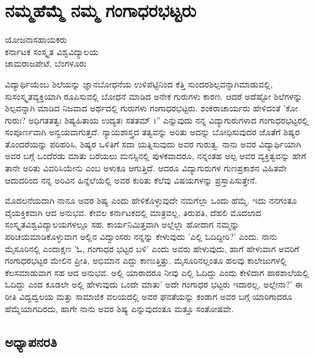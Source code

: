\chapter{ನಮ್ಮಹೆಮ್ಮೆ ನಮ್ಮ ಗಂಗಾಧರಭಟ್ಟರು}

\begin{center}
\smallskip
ಯೋಜನಾಸಹಾಯಕರು\\
ಕರ್ನಾಟಕ ಸಂಸ್ಕೃತ ವಿಶ್ವವಿದ್ಯಾಲಯ\\
ಚಾಮರಾಜಪೇಟೆ, ಬೆಂಗಳೂರು
\addrule
\end{center}

ವಿದ್ಯಾರ್ಥಿಯೆಂಬ ಶಿಲೆಯನ್ನು ಜ್ಞಾನಬೋಧನೆಯ ಉಳಿಪೆಟ್ಟಿನಿಂದ ಕೆತ್ತಿ ಸುಂದರಶಿಲ್ಪವನ್ನಾಗಿಮಾಡುವಲ್ಲಿ, ಸುಸಂಸ್ಕೃತವ್ಯಕ್ತಿಯಾಗಿ ರೂಪಿಸುವಲ್ಲಿ ಬೋಧನೆ ಮಾಡಿದ ಅನೇಕ ಗುರುಗಳು ಕಾರಣ. ಆದರೆ ಅದೆಷ್ಟೋ ಶಿಲೆಗಳನ್ನು ಶಿಲ್ಪವನ್ನಾಗಿ ಮಾಡಿದ ನಿಜವಾದ ಅರ್ಥದಲ್ಲಿ ಗುರುಗಳು ಗಂಗಾಧರಭಟ್ಟರು. ಶಂಕರಾಚಾರ್ಯರು ಹೇಳಿದಂತೆ ’ಕೋ ಗುರುಃ? ಅಧಿಗತತತ್ವಃ ಶಿಷ್ಯಹಿತಾಯ ಉದ್ಯತಃ ಸತತಮ್ ।” ಎನ್ನುವುದು ನನ್ನ ವಿದ್ಯಾಗುರುಗಳಾದ ಗಂಗಾಧರಭಟ್ಟರಲ್ಲಿ ಸಂಪೂರ್ಣವಾಗಿ ಅನ್ವಯವಾಗುತ್ತದೆ. ನ್ಯಾಯಶಾಸ್ತ್ರದ ತತ್ವವನ್ನು ಅರಿತು ಅದನ್ನು ಬೋಧಿಸುವುದರ ಜೊತೆಗೆ ಶಿಷ್ಯರ ತೊಂದರೆಯನ್ನು ಪರಿಹರಿಸಿ, ಶಿಷ್ಯರ ಒಳಿತಿಗೆ ಸದಾ ಯತ್ನಿಸುವುದು ಅವರ ಗುರುತ್ವ. ನಾನು ಅವರ ವಿದ್ಯಾರ್ಥಿಯಾಗಿ ಅವರ ಬಗ್ಗೆ ಒಂದೆರಡು ಮಾತು ಬರೆಯಲು ಮನಸ್ಸಿನಲ್ಲಿ ಪುಳಕವಾದರೂ, ನನ್ನಂತಹ ಅಲ್ಪ ಅವರ ವ್ಯಕ್ತಿತ್ವವನ್ನು ಹೇಗೆ ತಾನೇ ಅರಿತು ವಿವರಿಸಿಯೇನು ಎಂಬ ಅಳುಕೂ ಆಗುತ್ತಿದೆ. ಆದರೂ ವಿದ್ಯಾಗುರುಗಳ ಗುಣಪ್ರಕಾಶನ ವಿಹಿತವೇ ಆದುದರಿಂದ ನನ್ನ ಅರಿವಿನ ಹಿನ್ನೆಲೆಯೆಲ್ಲಿ ಅವರ ಕುರಿತು ಕೆಲೆವು ವಿಷಯಗಳನ್ನು ಪ್ರಸ್ತಾಪಿಸುತ್ತೇನೆ.

ಮೊದಲನೆಯದಾಗಿ ನಾನೂ ಅವರ ಶಿಷ್ಯ ಎಂದು ಹೇಳಿಕೊಳ್ಳುವುದೇ ನಮಗೆಲ್ಲಾ ಒಂದು ಹೆಮ್ಮೆ. ಇದು ನನಗಂತೂ ವೈಯಕ್ತಿಕವಾಗಿ ಆದ ಅನುಭವ. ಕೇವಲ ಕರ್ನಾಟಕದಲ್ಲಿ ಮಾತ್ರವಲ್ಲ, ತಿರುಪತಿ, ದೆಹಲಿ ಮೊದಲಾದ ಸಂಸ್ಕೃತವಿಶ್ವವಿದ್ಯಾಲಯಗಳಲ್ಲೂ ಸಹ. ಕಾರ್ಯನಿಮಿತ್ತವಾಗಿ ಅಲ್ಲೆಲ್ಲಾ ಹೋದಾಗ ನಮ್ಮನ್ನು ಪರಿಚಯಮಾಡಿಕೊಳ್ಳುವಾಗ ಅಲ್ಲಿನ ವಿದ್ವಾಂಸರು ನನ್ನನ್ನು ಕೇಳುವುದು ’ಎಲ್ಲಿ ಓದಿದ್ದೀರಿ?’ ಎಂದು. ನಾನು ಮೈಸೂರಿನಲ್ಲಿ ಎಂದಾಕ್ಷಣ ’ಓ, ಗಂಗಾಧರ ಭಟ್ಟರ ಬಳಿ’ ಎಂದು ಅವರು ಹೇಳುವುದು, ಹಾಗೆ ಹೇಳುವಾಗ ಅವರಿಗೆ ಗಂಗಾಧರಭಟ್ಟರ ಮೇಲಿನ ಪ್ರೀತಿ, ಅಭಿಮಾನ ಎದ್ದು ಕಾಣುತ್ತಿತ್ತು. ಮೈಸೂರಿನಲ್ಲಂತೂ ಹಲವು ಕಾಲೇಜುಗಳಲ್ಲಿ ಕೆಲಸಮಾಡುವಾಗ ಸಹ ಆದ ಅನುಭವ. ಅಲ್ಲಿ ಯಾರಾದರೂ ನೀವು ಎಲ್ಲಿ ಓದಿದ್ದು ಎಂದು ಕೇಳಿದಾಗ ಪಾಠಶಾಲೆಯಲ್ಲಿ ಓದಿದ್ದು ಎಂದ ಕೂಡಲೇ ಅಲ್ಲಿ ಹೇಳುವುದು ಒಂದೇ ಮಾತು’ ಅದೇ ಗಂಗಾಧರ ಭಟ್ಟರು ಇದಾರಲ್ಲ, ಅಲ್ಲೇನಾ?’ ಈ ರೀತಿ ವಿದ್ವದ್ವಲಯ ಮತ್ತು ಸಾಮಾಜಿಕ ವಲಯದಲ್ಲಿ ಅವರ ಘನತೆಯನ್ನು ಕಂಡಾಗ ಅವರ ಬಗ್ಗೆ ಯಾರಿಗಾದರೂ ಹೆಮ್ಮೆಯಾಗದಿರದು, ಹಾಗೇ ನಾನು ಅವರ ಶಿಷ್ಯ ಎನ್ನುವುದಂತೂ ಮತ್ತೂ ಸಂತೋಷವೇ.

\section*{ಅಧ್ಯಾಪನರತಿ}

